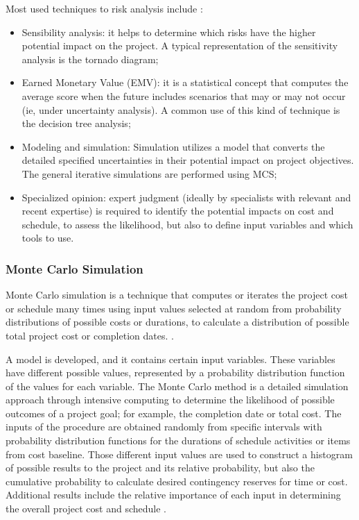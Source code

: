 \documentclass[a4paper,twoside]{article}
\begin{document}
Most used techniques to risk analysis include \cite{PMBOK2008}:
\begin{itemize}
\item Sensibility analysis: it helps to determine which risks have the higher potential impact on the project. A typical representation of the sensitivity analysis is the tornado diagram;
\item Earned Monetary Value (EMV): it is a statistical concept that computes the average score when the future includes scenarios that may or may not occur (ie, under uncertainty analysis). A common use of this kind of technique is the decision tree analysis;
\item Modeling and simulation: Simulation utilizes a model that converts the detailed specified uncertainties in their potential impact on project objectives. The general iterative simulations are performed using MCS;
\item Specialized opinion: expert judgment (ideally by specialists with relevant and recent expertise) is required to identify the potential impacts on cost and schedule, to assess the likelihood, but also to define input variables and which tools to use.
\end{itemize}

\subsubsection{Monte Carlo Simulation}

\noindent Monte Carlo simulation is a technique that computes or iterates the project cost or schedule many times using input values selected at random from probability distributions of possible costs or durations, to calculate a distribution of possible total project cost or completion dates. \cite{PMBOK2008}.

A model is developed, and it contains certain input variables. These variables have different possible values, represented by a probability distribution function of the values for each variable. The Monte Carlo method is a detailed simulation approach through intensive computing to determine the likelihood of possible outcomes of a project goal; for example, the completion date or total cost. The inputs of the procedure are obtained randomly from specific intervals with probability distribution functions for the durations of schedule activities or items from cost baseline. Those different input values are used to construct a histogram of possible results to the project and its relative probability, but also the cumulative probability to calculate desired contingency reserves for time or cost. Additional results include the relative importance of each input in determining the overall project cost and schedule \cite{kwak2007exploring}.
\end{document}
